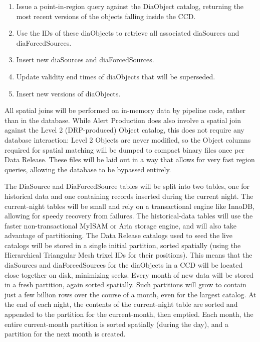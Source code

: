\documentclass[DM,lsstdraft,toc]{lsstdoc}
\begin{document}
\begin{enumerate}
\def\labelenumi{\arabic{enumi}.}
\item
  Issue a point-in-region query against the DiaObject catalog, returning
  the most recent versions of the objects falling inside the CCD.
\item
  Use the IDs of these diaObjects to retrieve all associated diaSources
  and diaForcedSources.
\item
  Insert new diaSources and diaForcedSources.
\item
  Update validity end times of diaObjects that will be superseded.
\item
  Insert new versions of diaObjects.
\end{enumerate}

All spatial joins will be performed on in-memory data by pipeline code,
rather than in the database. While Alert Production does also involve a
spatial join against the Level 2 (DRP-produced) Object catalog, this
does not require any database interaction: Level 2 Objects are never
modified, so the Object columns required for spatial matching will be
dumped to compact binary files once per Data Release. These files will
be laid out in a way that allows for very fast region queries, allowing
the database to be bypassed entirely.

The DiaSource and DiaForcedSource tables will be split into two tables,
one for historical data and one containing records inserted during the
current night. The current-night tables will be small and rely on a
transactional engine like InnoDB, allowing for speedy recovery from
failures. The historical-data tables will use the faster
non-transactional MyISAM or Aria storage engine, and will also take
advantage of partitioning. The Data Release catalogs used to seed the
live catalogs will be stored in a single initial partition, sorted
spatially (using the Hierarchical Triangular Mesh trixel IDs for their
positions). This means that the diaSources and diaForcedSources for the
diaObjects in a CCD will be located close together on disk, minimizing
seeks. Every month of new data will be stored in a fresh partition,
again sorted spatially. Such partitions will grow to contain just a few
billion rows over the course of a month, even for the largest catalog.
At the end of each night, the contents of the current-night table are
sorted and appended to the partition for the current-month, then
emptied. Each month, the entire current-month partition is sorted
spatially (during the day), and a partition for the next month is
created.
\end{document}
